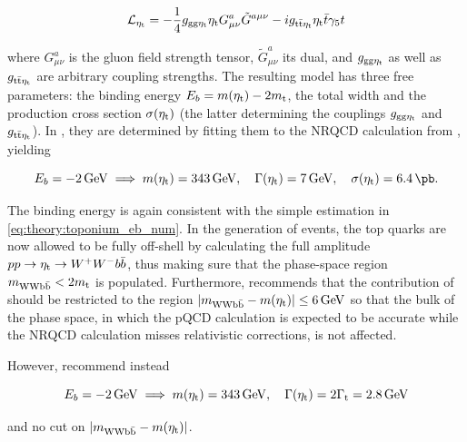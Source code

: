 \begin{equation}
\label{eq:theory:etatlagrangian}
  \mathcal{L}_{\mathrm{\eta_t}} = - \frac{1}{4} g_{\mathrm{gg} \mathrm{\eta_t}} \mathrm{\eta_t} G^{a}_{\mu \nu} \tilde{G}^{a \mu \nu} - i g_{\mathrm{t \bar{t}} \mathrm{\eta_t}} \mathrm{\eta_t} \bar{t} \gamma_5 t
\end{equation}

\noindent where $G^{a}_{\mu \nu}$ is the gluon field strength tensor, $\tilde{G}^{a}_{\mu \nu}$ its dual, and $g_{\mathrm{gg} \mathrm{\eta_t}}$ as well as $g_{\mathrm{t \bar{t}} \mathrm{\eta_t}}$ are arbitrary coupling strengths. The resulting model has three free parameters: the binding energy $E_b = m(\mathrm{\eta_t}) - 2 m_{\mathrm{t}}$, the total width \Gammaetat and the production cross section $\sigma(\mathrm{\eta_t})$ (the latter determining the couplings $g_{\mathrm{gg} \mathrm{\eta_t}}$ and $g_{\mathrm{t \bar{t}} \mathrm{\eta_t}}$). In , they are determined by fitting them to the NRQCD calculation from , yielding

\begin{equation}
  \label{eq:theory:etatparams_7gev}
  E_b = \SI{-2}{\GeV} \implies \metat = \SI{343}{\GeV}, \quad \Gammaetat = \SI{7}{\GeV}, \quad \sigma(\etat) = \SI{6.4}{\pb} .
\end{equation}

The binding energy is again consistent with the simple estimation in \cref{eq:theory:toponium_eb_num}.
In the generation of events, the top quarks are now allowed to be fully off-shell by calculating the full amplitude $p p \rightarrow \mathrm{\eta_t} \rightarrow W^+ W^- b \bar{b}$, thus making sure that the phase-space region $m_{\mathrm{WWb\bar{b}}} < 2 m_{\mathrm{t}}$ is populated. Furthermore,  recommends that the contribution of \etat should be restricted to the region $|m_{\mathrm{WWb\bar{b}}} - m(\mathrm{\eta_t})| \leq \SI{6}{GeV}$ so that the bulk of the \ttbar phase space, in which the pQCD calculation is expected to be accurate while the NRQCD calculation misses relativistic corrections, is not affected.

However,  recommend instead

\begin{equation}
  \label{eq:theory:etatparams_2p8gev}
  E_b = \SI{-2}{\GeV} \implies \metat = \SI{343}{\GeV}, \quad \Gammaetat = 2 \Gammat = \SI{2.8}{\GeV}
\end{equation}

\noindent and no cut on $|m_{\mathrm{WWb\bar{b}}} - m(\mathrm{\eta_t})|$.


